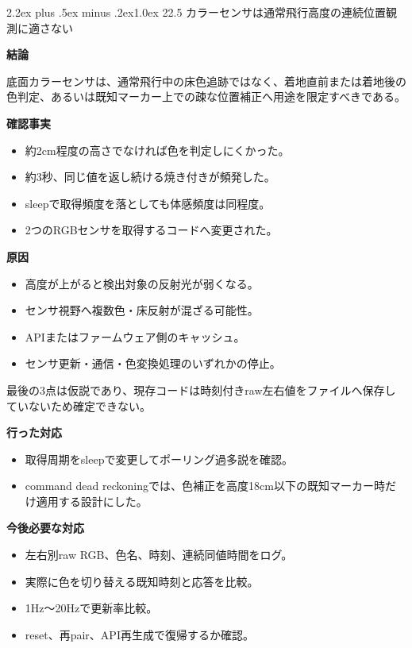 \documentclass[10pt,a4paper,openany]{ltjsbook}
\makeatletter
\renewcommand\section{\@startsection{section}{1}{0pt}%
  {2.2ex plus .5ex minus .2ex}{1.0ex}%
  {\sffamily\Large\bfseries\color{ReportNavy}}}
\newcommand{\reportlabel}[1]{%
  \par\vspace{0.55em}%
  \noindent\colorbox{ReportTeal}{%
    \parbox{\dimexpr\linewidth-2\fboxsep\relax}{%
      \sffamily\bfseries\color{white}#1%
    }%
  }\par\vspace{0.20em}%
}
\makeatother
\begin{document}
\section{22.5 カラーセンサは通常飛行高度の連続位置観測に適さない}
\reportlabel{結論}
底面カラーセンサは、通常飛行中の床色追跡ではなく、着地直前または着地後の色判定、あるいは既知マーカー上での疎な位置補正へ用途を限定すべきである。\par
\reportlabel{確認事実}
\begin{itemize}
\item 約2cm程度の高さでなければ色を判定しにくかった。
\item 約3秒、同じ値を返し続ける焼き付きが頻発した。
\item sleepで取得頻度を落としても体感頻度は同程度。
\item 2つのRGBセンサを取得するコードへ変更された。
\end{itemize}
\reportlabel{原因}
\begin{itemize}
\item 高度が上がると検出対象の反射光が弱くなる。
\item センサ視野へ複数色・床反射が混ざる可能性。
\item APIまたはファームウェア側のキャッシュ。
\item センサ更新・通信・色変換処理のいずれかの停止。
\end{itemize}
最後の3点は仮説であり、現存コードは時刻付きraw左右値をファイルへ保存していないため確定できない。\par
\reportlabel{行った対応}
\begin{itemize}
\item 取得周期をsleepで変更してポーリング過多説を確認。
\item command dead reckoningでは、色補正を高度18cm以下の既知マーカー時だけ適用する設計にした。
\end{itemize}
\reportlabel{今後必要な対応}
\begin{itemize}
\item 左右別raw RGB、色名、時刻、連続同値時間をログ。
\item 実際に色を切り替える既知時刻と応答を比較。
\item 1Hz〜20Hzで更新率比較。
\item reset、再pair、API再生成で復帰するか確認。
\end{itemize}
\end{document}
